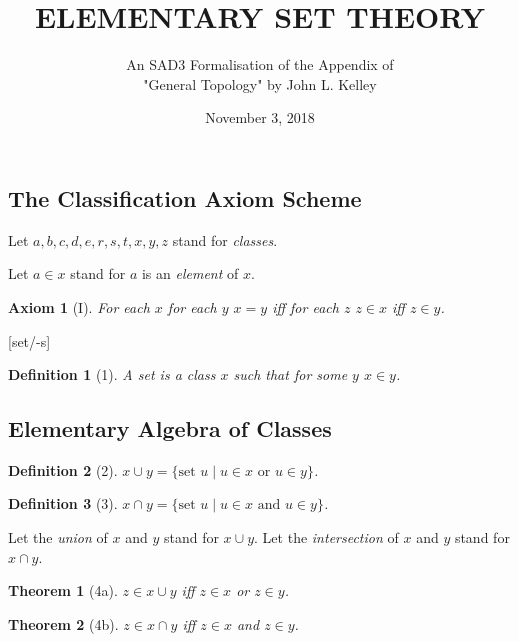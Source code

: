 \documentclass{scrartcl}
\newtheorem*{axiom}{Axiom}
\newtheorem*{theorem}{Theorem}
\newtheorem*{definition}{Definition}
\begin{document}
\title{ELEMENTARY SET THEORY}

\subtitle{An SAD3 Formalisation of the Appendix of \\"General Topology" 
by John L. Kelley}

\date{November 3, 2018}

\maketitle


\subsection{The Classification Axiom Scheme}


Let $a,b,c,d,e,r,s,t,x,y,z$ stand for \emph{classes}.


Let $a \in x$ stand for $a$ is an \emph{element} of $x$.

\begin{axiom}[I]
For each $x$ for each $y$ $x = y$ iff for each $z$ 
$z \in x$ iff $z \in y$.
\end{axiom}

[set/-s]
\begin{definition}[1] A \emph{set} is a class $x$ such that for some $y$ $x \in y$.
\end{definition}


\subsection{Elementary Algebra of Classes}


\begin{definition}[2] $x \cup y = \{\text{set } u \mid u \in x \text{ or } u \in y \}$.
\end{definition}

\begin{definition}[3] $x \cap y = \{\text{set } u \mid u \in x \text{ and } u \in y \}$.
\end{definition}

Let the \emph{union} of $x$ and $y$ stand for $x \cup y$.
Let the \emph{intersection} of $x$ and $y$ stand for $x \cap y$.

\begin{theorem}[4a] $z \in x \cup y$ iff $z \in x$ or $z \in y$.
\end{theorem}

\begin{theorem}[4b] $z \in x \cap y$ iff $z \in x$ and $z \in y$.
\end{theorem}
\end{document}
